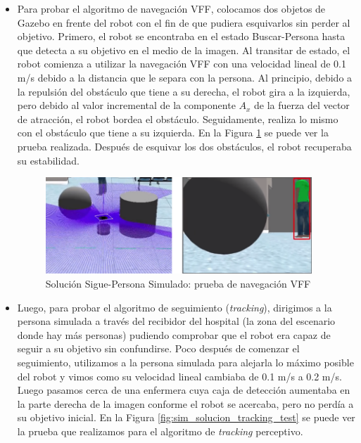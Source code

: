 \begin{itemize}
	\item Para probar el algoritmo de navegación VFF, colocamos dos objetos de Gazebo en frente del robot con el fin de que pudiera esquivarlos sin perder al objetivo. Primero, el robot se encontraba en el estado Buscar-Persona hasta que detecta a su objetivo en el medio de la imagen. Al transitar de estado, el robot comienza a utilizar la navegación VFF con una velocidad lineal de 0.1 m/s debido a la distancia que le separa con la persona. Al principio, debido a la repulsión del obstáculo que tiene a su derecha, el robot gira a la izquierda, pero debido al valor incremental de la componente $A_{x}$ de la fuerza del vector de atracción, el robot bordea el obstáculo. Seguidamente, realiza lo mismo con el obstáculo que tiene a su izquierda. En la Figura \ref{fig:sim_solucion_vff_test} se puede ver la prueba realizada. Después de esquivar los dos obstáculos, el robot recuperaba su estabilidad.
	
	\begin{figure} [H]
		\begin{center}
		\includegraphics[width=10cm]{imagenes/cap6/sim-solution-vff-test.png}
		\end{center}
		\caption[Solución Sigue-Persona Simulado: prueba de navegación VFF]{Solución Sigue-Persona Simulado: prueba de navegación VFF}
		\label{fig:sim_solucion_vff_test}
	\end{figure}

	\item Luego, para probar el algoritmo de seguimiento (\textit{tracking}), dirigimos a la persona simulada a través del recibidor del hospital (la zona del escenario donde hay más personas) pudiendo comprobar que el robot era capaz de seguir a su objetivo sin confundirse. Poco después de comenzar el seguimiento, utilizamos a la persona simulada para alejarla lo máximo posible del robot y vimos como su velocidad lineal cambiaba de 0.1 m/s a 0.2 m/s. Luego pasamos cerca de una enfermera cuya caja de detección aumentaba en la parte derecha de la imagen conforme el robot se acercaba, pero no perdía a su objetivo inicial. En la Figura \ref{fig:sim_solucion_tracking_test} se puede ver la prueba que realizamos para el algoritmo de \textit{tracking} perceptivo.


\end{itemize}
